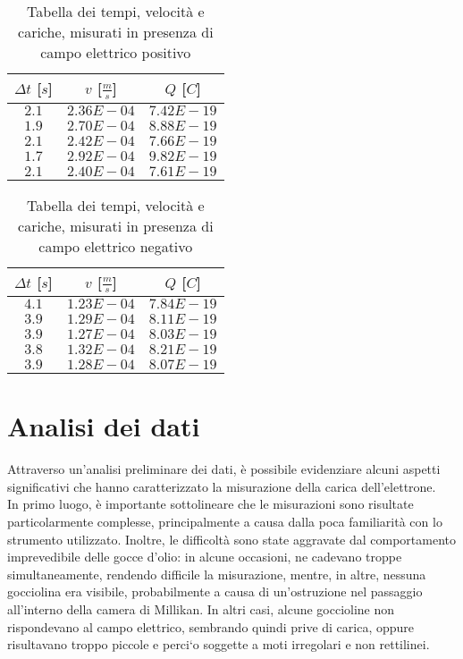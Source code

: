\documentclass{article}
\begin{document}
\begin{multicols}{2}

\begin{table}[H]
	\centering
	\begin{tabular}{| c | c | c |}
		\hline
		$\Delta t$ [$s$] & $v$ [$\frac ms$] & $Q$ [$C$] \\
		\hline
		$2.1$ & $2.36E-04$ & $7.42E-19$ \\
		$1.9$ & $2.70E-04$ & $8.88E-19$ \\
		$2.1$ & $2.42E-04$ & $7.66E-19$ \\
		$1.7$ & $2.92E-04$ & $9.82E-19$ \\
		$2.1$ & $2.40E-04$ & $7.61E-19$ \\
		\hline
	\end{tabular}
	\caption{Tabella dei tempi, velocità e cariche, misurati in presenza di campo elettrico positivo}
	\label{}
\end{table}

\columnbreak

\begin{table}[H]
	\centering
	\begin{tabular}{| c | c | c |}
		\hline
		$\Delta t$ [$s$] & $v$ [$\frac ms$] & $Q$ [$C$] \\
		\hline
		$4.1$ & $1.23E-04$ & $7.84E-19$ \\
		$3.9$ & $1.29E-04$ & $8.11E-19$ \\
		$3.9$ & $1.27E-04$ & $8.03E-19$ \\
		$3.8$ & $1.32E-04$ & $8.21E-19$ \\
		$3.9$ & $1.28E-04$ & $8.07E-19$ \\
		\hline		
	\end{tabular}
	\caption{Tabella dei tempi, velocità e cariche, misurati in presenza di campo elettrico negativo}
	\label{}
\end{table}
	
\end{multicols}

\section{Analisi dei dati}
Attraverso un'analisi preliminare dei dati, è possibile evidenziare alcuni aspetti significativi che hanno caratterizzato la misurazione della carica dell'elettrone.\\

In primo luogo, è importante sottolineare che le misurazioni sono risultate particolarmente complesse, principalmente a causa dalla poca familiarità con lo strumento utilizzato. Inoltre, le difficoltà sono state aggravate dal comportamento imprevedibile delle gocce d'olio: in alcune occasioni, ne cadevano troppe simultaneamente, rendendo difficile la misurazione, mentre, in altre, nessuna gocciolina era visibile, probabilmente a causa di un'ostruzione nel passaggio all'interno della camera di Millikan. In altri casi, alcune goccioline non rispondevano al campo elettrico, sembrando quindi prive di carica, oppure risultavano troppo piccole e perci`o soggette a moti irregolari e non rettilinei.\\
\end{document}
